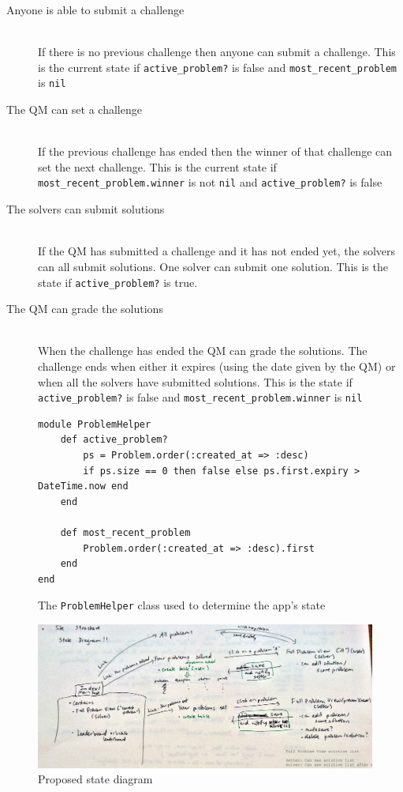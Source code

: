 \documentclass{report}
\begin{document}
\begin{description}
  \item[Anyone is able to submit a challenge] \hfill \\ If there is no previous challenge then anyone can submit a challenge. This is the current state if \texttt{active\_problem?} is false and \texttt{most\_recent\_problem} is \texttt{nil}
  \item[The QM can set a challenge] \hfill \\ If the previous challenge has ended then the winner of that challenge can set the next challenge. This is the current state if \texttt{most\_recent\_problem.winner} is not \texttt{nil} and \texttt{active\_problem?} is false
  \item[The solvers can submit solutions] \hfill \\ If the QM has submitted a challenge and it has not ended yet, the solvers can all submit solutions. One solver can submit one solution. This is the state if \texttt{active\_problem?} is true.
  \item[The QM can grade the solutions] \hfill \\ When the challenge has ended the QM can grade the solutions. The challenge ends when either it expires (using the date given by the QM) or when all the solvers have submitted solutions. This is the state if \texttt{active\_problem?} is false and \texttt{most\_recent\_problem.winner} is \texttt{nil}
\end{description}

\begin{figure}[h]
\begin{verbatim}
module ProblemHelper
    def active_problem?
        ps = Problem.order(:created_at => :desc)
        if ps.size == 0 then false else ps.first.expiry > DateTime.now end
    end

    def most_recent_problem
        Problem.order(:created_at => :desc).first
    end
end
\end{verbatim}
\caption{The \texttt{ProblemHelper} class used to determine the app's state}
\end{figure}

\begin{figure}[H]
\includegraphics[width=\textwidth]{structure}
\caption{Proposed state diagram}
\end{figure}
\end{document}
